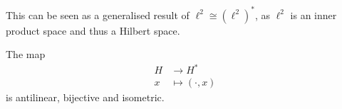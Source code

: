 \documentclass[a4paper]{article}
\begin{document}
This can be seen as a generalised result of \(\ell^2 \cong (\ell^2)^*\), as \(\ell^2\) is an inner product space and thus a Hilbert space.

\begin{corollary}
  The map
  \begin{align*}
    H &\to H^* \\
    x &\mapsto (\cdot, x)
  \end{align*}
  is antilinear, bijective and isometric.
\end{corollary}















\printindex
\end{document}

